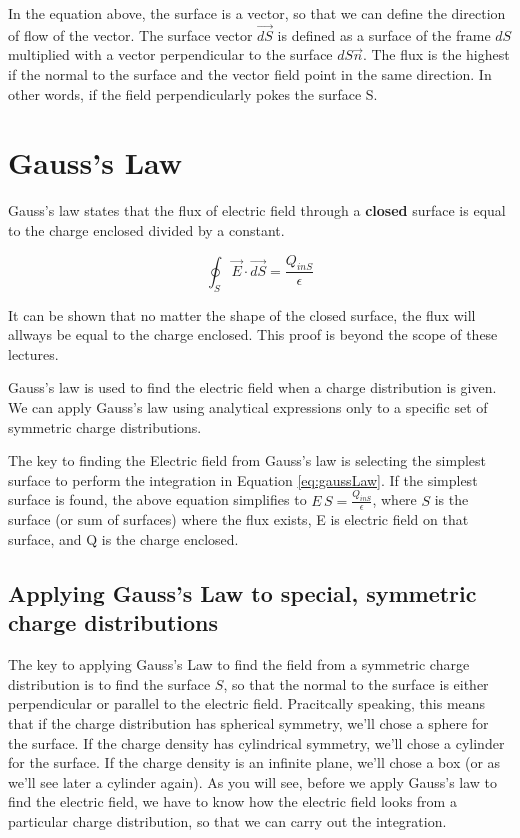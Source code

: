 \documentclass{ximera}
\begin{document}
In the equation above, the surface is a vector, so that we can define the direction of flow of the vector. The surface vector $\vec{dS}$ is defined as a surface of the frame $dS$ multiplied with a vector perpendicular to the surface $dS \vec{n}$. The flux is the highest if the normal to the surface and the vector field point in the same direction. In other words, if the field perpendicularly pokes the surface S.


\section{Gauss's Law}


Gauss's law states that the flux of electric field through a {\bf closed} surface is equal to the charge enclosed divided by a constant.

\begin{equation}
\oint_S \vec{E} \cdot \vec{dS} = \frac{Q_{inS}}{\epsilon} \label{eq:gaussLaw}
\end{equation}


It can be shown that no matter the shape of the closed surface, the flux will allways be equal to the charge enclosed. This proof is beyond the scope of these lectures.


Gauss's law is used to find the electric field when a charge distribution is given. We can apply Gauss's law using analytical expressions only to a specific set of symmetric charge distributions.


 The key to finding the Electric field from Gauss's law is selecting the simplest surface to perform the integration in Equation \ref{eq:gaussLaw}. If the simplest surface is found, the above equation simplifies to $E \, S = \frac{Q_{inS}}{\epsilon}$, where $S$ is the surface (or sum of surfaces) where the flux exists, E is electric field on that surface, and Q is the charge enclosed.

\subsection{Applying Gauss's Law to special, symmetric charge distributions} 

The key to applying Gauss's Law to find the field from a symmetric charge distribution is to find the surface $S$, so that the normal to the surface is either perpendicular or parallel to the electric field. Pracitcally speaking, this means that if the charge distribution has spherical symmetry, we'll chose a sphere for the surface. If the charge density has cylindrical symmetry, we'll chose a cylinder for the surface. If the charge density is an infinite plane, we'll chose a box (or as we'll see later a cylinder again). As you will see, before we apply Gauss's law to find the electric field, we have to know how the electric field looks from a particular charge distribution, so that we can carry out the integration.
\end{document}
